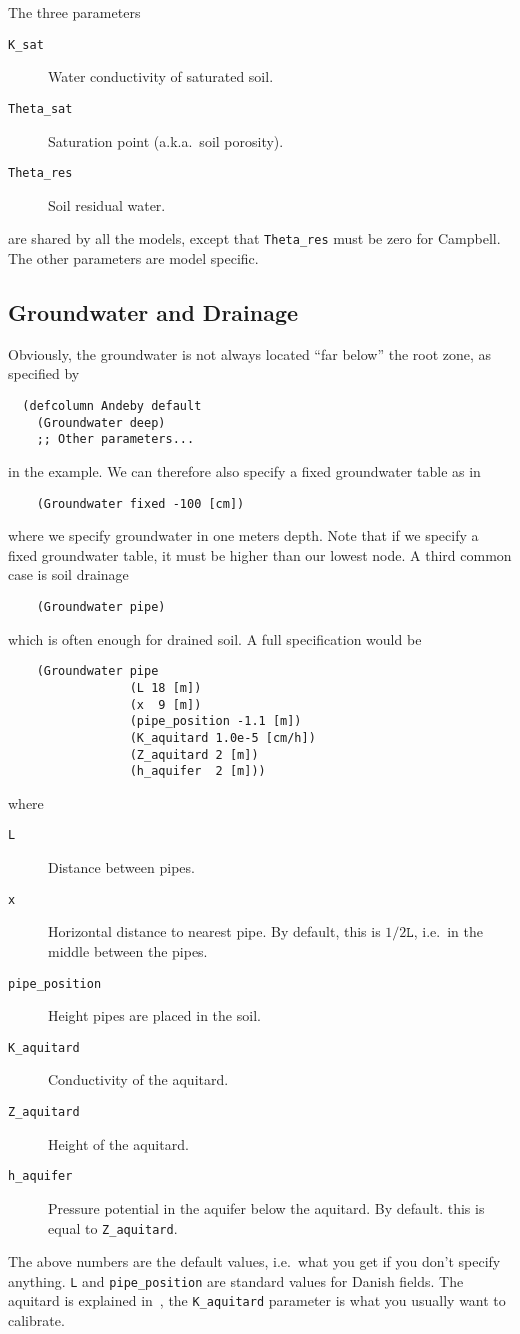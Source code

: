 \documentclass[a4paper,11pt]{article}
\begin{document}
The three parameters
\begin{description}
\item[\texttt{K\_sat}] Water conductivity of saturated soil.
\item[\texttt{Theta\_sat}] Saturation point (a.k.a.\ soil porosity).
\item[\texttt{Theta\_res}] Soil residual water.
\end{description}
are shared by all the models, except that \texttt{Theta\_res} must be
zero for Campbell.  The other parameters are model specific.

\subsection{Groundwater and Drainage}
\label{sec:groundwater}

Obviously, the groundwater is not always located ``far below'' the
root zone, as specified by
\begin{verbatim}
  (defcolumn Andeby default
    (Groundwater deep)
    ;; Other parameters...
\end{verbatim}
in the example.  We can therefore also specify a fixed groundwater
table as in
\begin{verbatim}
    (Groundwater fixed -100 [cm])
\end{verbatim}
where we specify groundwater in one meters depth.  Note that if we
specify a fixed groundwater table, it must be higher than our lowest
node.  A third common case is soil drainage
\begin{verbatim}
    (Groundwater pipe)
\end{verbatim}
which is often enough for drained soil.  A full specification would be
\begin{verbatim}
    (Groundwater pipe
                 (L 18 [m])
                 (x  9 [m])
                 (pipe_position -1.1 [m])
                 (K_aquitard 1.0e-5 [cm/h])
                 (Z_aquitard 2 [m])
                 (h_aquifer  2 [m]))
\end{verbatim}
where
\begin{description}
\item[\texttt{L}] Distance between pipes.
\item[\texttt{x}] Horizontal distance to nearest pipe. By default,
  this is $1/2 \mathtt{L}$, i.e.\ in the middle between the pipes.
\item[\texttt{pipe\_position}] Height pipes are placed in the soil.
\item[\texttt{K\_aquitard}] Conductivity of the aquitard.
\item[\texttt{Z\_aquitard}] Height of the aquitard.
\item[\texttt{h\_aquifer}] Pressure potential in the aquifer below the
  aquitard. By default. this is equal to \texttt{Z\_aquitard}.
\end{description}
The above numbers are the default values, i.e.\ what you get if you
don't specify anything.  \texttt{L} and \texttt{pipe\_position} are
standard values for Danish fields.  The aquitard is explained
in~\cite{daisy-new}, the \texttt{K\_aquitard} parameter is what
you usually want to calibrate.
\end{document}
